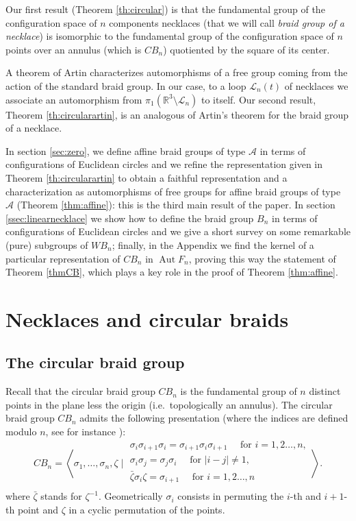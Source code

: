 \documentclass[11pt]{amsart}
\begin{document}
Our first result (Theorem \ref{th:circular}) is that the fundamental group of the configuration space of $n$ components necklaces (that we will call  \emph{braid group of a necklace})
is isomorphic to 
the fundamental group of the configuration space of $n$ points 
over an annulus (which is $CB_n$)  quotiented by the square of its center.  

A theorem of Artin characterizes automorphisms of a free group coming 
from the action of the standard braid group. In our case, to a loop $\mathcal{L}_n(t)$ of necklaces we associate
an automorphism from $\pi_1({\mathbb{R}}^3\setminus\mathcal{L}_n)$ to itself.
Our second result, Theorem \ref{th:circularartin},  is an analogous of Artin's theorem for the braid group of a necklace.

In section \ref{sec:zero}, we define affine braid groups of type $\mathcal{A}$ in terms of configurations of Euclidean circles
and we refine the representation given  in Theorem \ref{th:circularartin} to obtain
 a faithful representation and a characterization as automorphisms of free groups for affine braid groups of type $\mathcal{A}$ (Theorem \ref{thm:affine}):
 this is the third main result of the paper.
In section \ref{ssec:linearnecklace} we show how to define the braid group $B_n$
 in terms of configurations of Euclidean circles and we give a short survey on some remarkable (pure) subgroups
 of $WB_n$; finally,  in the Appendix we find the kernel of a particular representation of $CB_n$ in ${\mathop{\mathrm{Aut}}\nolimits} F_n$, proving this way the statement of Theorem
 \ref{thmCB}, which plays a key role in the proof of  Theorem \ref{thm:affine}.

\section{Necklaces and circular braids}
\label{sec:necklace}

\subsection{The circular braid group}

Recall that the circular braid group $CB_n$ is the fundamental group
of $n$ distinct points in the plane less the origin (i.e.~topologically an annulus).
The circular braid group $CB_n$
admits the following  presentation (where the indices are defined modulo $n$, see for instance \cite{KP}):
$$CB_n = \left\langle \sigma_1,\ldots,\sigma_n, \zeta \mid
\begin{array}{l}
\sigma_i\sigma_{i+1}\sigma_i = \sigma_{i+1}\sigma_i\sigma_{i+1} \quad \text{ for } i = 1,2\ldots, n, \\
\sigma_i\sigma_j=\sigma_j\sigma_i \quad \text{ for } |i-j| \neq 1, \\
{\bar{{\zeta}}} \sigma_i \zeta =\sigma_{i+1} \quad \text{ for } i = 1,2\ldots, n \\
\end{array}
\right\rangle.
$$
where ${\bar{{\zeta}}}$ stands for $\zeta^{-1}$.
Geometrically $\sigma_i$ consists in permuting the $i$-th and $i+1$-th point and $\zeta$ in a cyclic permutation
of the points.
\end{document}
